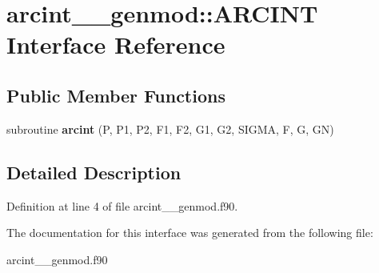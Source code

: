 \hypertarget{interfacearcint____genmod_1_1_a_r_c_i_n_t}{\section{arcint\+\_\+\+\_\+genmod\+:\+:A\+R\+C\+I\+N\+T Interface Reference}
\label{interfacearcint____genmod_1_1_a_r_c_i_n_t}
}
\subsection*{Public Member Functions}
\begin{DoxyCompactItemize}
\item 
\hypertarget{interfacearcint____genmod_1_1_a_r_c_i_n_t_a3874c492fd55210117eadf9e0897264f}{subroutine {\bfseries arcint} (P, P1, P2, F1, F2, G1, G2, S\+I\+G\+M\+A, F, G, G\+N)}\label{interfacearcint____genmod_1_1_a_r_c_i_n_t_a3874c492fd55210117eadf9e0897264f}

\end{DoxyCompactItemize}


\subsection{Detailed Description}


Definition at line 4 of file arcint\+\_\+\+\_\+genmod.\+f90.



The documentation for this interface was generated from the following file\+:\begin{DoxyCompactItemize}
\item 
arcint\+\_\+\+\_\+genmod.\+f90\end{DoxyCompactItemize}
